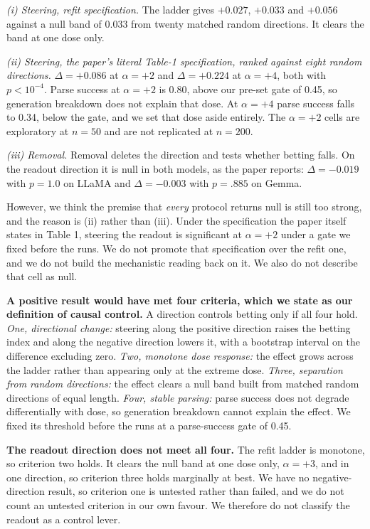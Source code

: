 \emph{(i) Steering, refit specification.} The ladder gives $+0.027$, $+0.033$ and $+0.056$ against a
null band of 0.033 from twenty matched random directions. It clears the band at one dose only.

\emph{(ii) Steering, the paper's literal Table-1 specification, ranked against eight random
directions.} $\Delta = +0.086$ at $\alpha = +2$ and $\Delta = +0.224$ at $\alpha = +4$, both with
$p < 10^{-4}$. Parse success at $\alpha = +2$ is 0.80, above our pre-set gate of 0.45, so generation
breakdown does not explain that dose. At $\alpha = +4$ parse success falls to 0.34, below the gate,
and we set that dose aside entirely. The $\alpha = +2$ cells are exploratory at $n = 50$ and are not
replicated at $n = 200$.

\emph{(iii) Removal.} Removal deletes the direction and tests whether betting falls. On the readout
direction it is null in both models, as the paper reports: $\Delta = -0.019$ with $p = 1.0$ on
LLaMA and $\Delta = -0.003$ with $p = .885$ on Gemma.

However, we think the premise that \emph{every} protocol returns null is still too strong, and the
reason is (ii) rather than (iii). Under the specification the paper itself states in Table 1,
steering the readout is significant at $\alpha = +2$ under a gate we fixed before the runs. We do
not promote that specification over the refit one, and we do not build the mechanistic reading back
on it. We also do not describe that cell as null.

\textbf{A positive result would have met four criteria, which we state as our definition of causal
control.} A direction controls betting only if all four hold. \emph{One, directional change:}
steering along the positive direction raises the betting index and along the negative direction
lowers it, with a bootstrap interval on the difference excluding zero. \emph{Two, monotone dose
response:} the effect grows across the ladder rather than appearing only at the extreme dose.
\emph{Three, separation from random directions:} the effect clears a null band built from matched
random directions of equal length. \emph{Four, stable parsing:} parse success does not degrade
differentially with dose, so generation breakdown cannot explain the effect. We fixed its threshold
before the runs at a parse-success gate of 0.45.

\textbf{The readout direction does not meet all four.} The refit ladder is monotone, so criterion
two holds. It clears the null band at one dose only, $\alpha = +3$, and in one direction, so
criterion three holds marginally at best. We have no negative-direction result, so criterion one is
untested rather than failed, and we do not count an untested criterion in our own favour. We
therefore do not classify the readout as a control lever.

